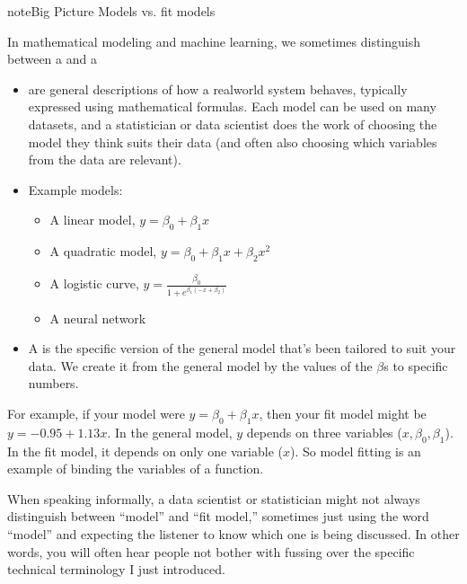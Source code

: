 \documentclass[letterpaper,10pt,english]{jupyterBook}
\begin{document}
\begin{sphinxadmonition}{note}{Big Picture \sphinxhyphen{} Models vs. fit models}

\sphinxAtStartPar
In mathematical modeling and machine learning, we sometimes distinguish between a  and a 
\begin{itemize}
\item {} 
\sphinxAtStartPar
{} are general descriptions of how a real\sphinxhyphen{}world system behaves, typically expressed using mathematical formulas.  Each model can be used on many datasets, and a statistician or data scientist does the work of choosing the model they think suits their data (and often also choosing which variables from the data are relevant).

\item {} 
\sphinxAtStartPar
Example models:
\begin{itemize}
\item {} 
\sphinxAtStartPar
A linear model, \(y=\beta_0+\beta_1x\)

\item {} 
\sphinxAtStartPar
A quadratic model, \(y=\beta_0+\beta_1x+\beta_2x^2\)

\item {} 
\sphinxAtStartPar
A logistic curve, \(y=\frac{\beta_0}{1+e^{\beta_1(-x+\beta_2)}}\)

\item {} 
\sphinxAtStartPar
A neural network

\end{itemize}

\item {} 
\sphinxAtStartPar
A  is the specific version of the general model that’s been tailored to suit your data.  We create it from the general model by  the values of the \(\beta\)s to specific numbers.

\end{itemize}

\sphinxAtStartPar
For example, if your model were \(y=\beta_0+\beta_1x\), then your fit model might be \(y=-0.95+1.13x\).  In the general model, \(y\) depends on three variables (\(x,\beta_0,\beta_1\)).  In the fit model, it depends on only one variable (\(x\)).  So model fitting is an example of binding the variables of a function.
\end{sphinxadmonition}

\sphinxAtStartPar
When speaking informally, a data scientist or statistician might not always distinguish between “model” and “fit model,” sometimes just using the word “model” and expecting the listener to know which one is being discussed.  In other words, you will often hear people not bother with fussing over the specific technical terminology I just introduced.
\end{document}
